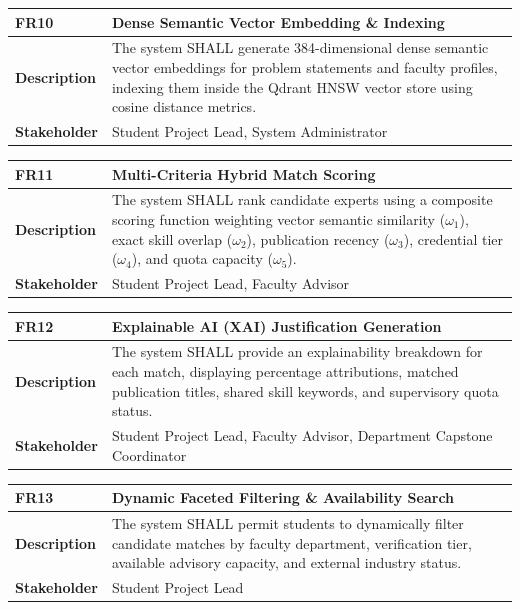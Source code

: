 \begin{table}[H]
\centering
\small
\begin{tabularx}{\textwidth}{|l|X|}
\hline
\rowcolor{lightgray!40} \textbf{FR10} & \textbf{Dense Semantic Vector Embedding \& Indexing} \\ \hline
\textbf{Description} & The system SHALL generate 384-dimensional dense semantic vector embeddings for problem statements and faculty profiles, indexing them inside the Qdrant HNSW vector store using cosine distance metrics. \\ \hline
\textbf{Stakeholder} & Student Project Lead, System Administrator \\ \hline
\end{tabularx}
\end{table}

\begin{table}[H]
\centering
\small
\begin{tabularx}{\textwidth}{|l|X|}
\hline
\rowcolor{lightgray!40} \textbf{FR11} & \textbf{Multi-Criteria Hybrid Match Scoring} \\ \hline
\textbf{Description} & The system SHALL rank candidate experts using a composite scoring function weighting vector semantic similarity ($\omega_1$), exact skill overlap ($\omega_2$), publication recency ($\omega_3$), credential tier ($\omega_4$), and quota capacity ($\omega_5$). \\ \hline
\textbf{Stakeholder} & Student Project Lead, Faculty Advisor \\ \hline
\end{tabularx}
\end{table}

\begin{table}[H]
\centering
\small
\begin{tabularx}{\textwidth}{|l|X|}
\hline
\rowcolor{lightgray!40} \textbf{FR12} & \textbf{Explainable AI (XAI) Justification Generation} \\ \hline
\textbf{Description} & The system SHALL provide an explainability breakdown for each match, displaying percentage attributions, matched publication titles, shared skill keywords, and supervisory quota status. \\ \hline
\textbf{Stakeholder} & Student Project Lead, Faculty Advisor, Department Capstone Coordinator \\ \hline
\end{tabularx}
\end{table}

\begin{table}[H]
\centering
\small
\begin{tabularx}{\textwidth}{|l|X|}
\hline
\rowcolor{lightgray!40} \textbf{FR13} & \textbf{Dynamic Faceted Filtering \& Availability Search} \\ \hline
\textbf{Description} & The system SHALL permit students to dynamically filter candidate matches by faculty department, verification tier, available advisory capacity, and external industry status. \\ \hline
\textbf{Stakeholder} & Student Project Lead \\ \hline
\end{tabularx}
\end{table}

